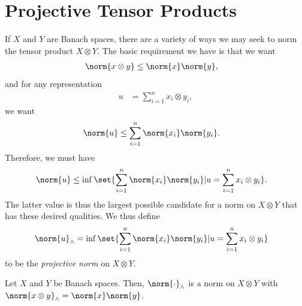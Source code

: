 \documentclass[10pt]{mypackage}
\begin{document}
\section{Projective Tensor Products}%
If $X$ and $Y$ are Banach spaces, there are a variety of ways we may seek to norm the tensor product $X\otimes Y$. The basic requirement we have is that we want
\begin{align*}
  \norm{x\otimes y} &\leq \norm{x}\norm{y},
\end{align*}
and for any representation
\begin{align*}
  u &= \sum_{i=1}^{n}x_i\otimes y_i,
\end{align*}
we want
\begin{align*}
  \norm{u} &\leq \sum_{i=1}^{n} \norm{x_i}\norm{y_i}.
\end{align*}
Therefore, we must have
\begin{align*}
  \norm{u} &\leq \inf\set{\sum_{i=1}^{n}\norm{x_i}\norm{y_i} | u = \sum_{i=1}^{n}x_i\otimes y_i}.
\end{align*}
The latter value is thus the largest possible candidate for a norm on $X\otimes Y$ that has these desired qualities. We thus define
\begin{align*}
  \norm{u}_{\wedge} &= \inf\set{\sum_{i=1}^{n}\norm{x_i}\norm{y_i} | u=\sum_{i=1}^{n}x_i\otimes y_i}
\end{align*}
to be the \textit{projective norm} on $X\otimes Y$.
\begin{proposition}
  Let $X$ and $Y$ be Banach spaces. Then, $\norm{\cdot}_{\wedge}$ is a norm on $X\otimes Y$ with $\norm{x\otimes y}_{\wedge} = \norm{x}\norm{y}$.
\end{proposition}
\end{document}
